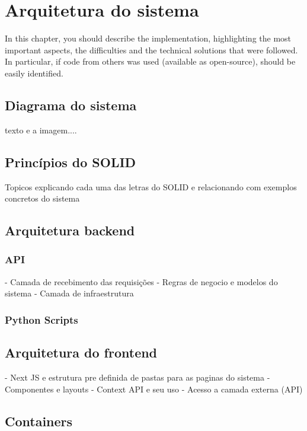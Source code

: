 


\chapter{Arquitetura do sistema}\label{cap:development}

In this chapter, you should describe the implementation, highlighting the most important aspects, the difficulties and the technical solutions that were followed. In particular, if code from others was used (available as open-source), should be easily identified.

\section[Diagrama do sistema]{Diagrama do sistema}
texto e a imagem....

\section[Princípios do SOLID]{Princípios do SOLID}
Topicos explicando cada uma das letras do SOLID e relacionando com exemplos concretos do sistema


\section[Arquitetura do backend]{Arquitetura backend}

\subsection*{API}
- Camada de recebimento das requisições
- Regras de negocio e modelos do sistema
- Camada de infraestrutura

\subsection*{Python Scripts}


\section[Arquitetura do frontend]{Arquitetura do frontend}
- Next JS e estrutura pre definida de pastas para as paginas do sistema
- Componentes e layouts
- Context API e seu uso
- Acesso a camada externa (API)

\section{Containers}